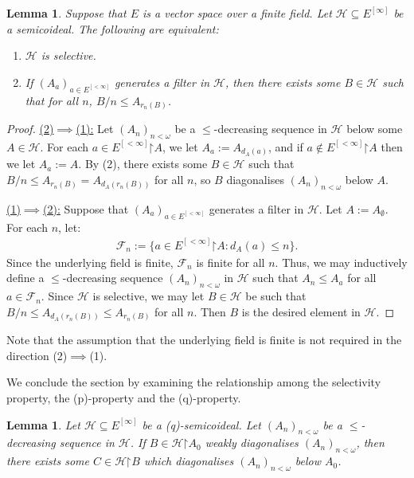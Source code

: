\documentclass[10pt,a4paper]{amsart}
\theoremstyle{plain}
\numberwithin{equation}{section}
\newtheorem{lemma}[theorem]{Lemma}
\theoremstyle{definition}
\newcommand{\F}{\cal{F}}
\newcommand{\cal}{\mathcal}
\newcommand{\restrictedto}{\mathord{\upharpoonright}}
\renewcommand{\H}{\cal{H}}
\begin{document}
\begin{lemma}
    Suppose that $E$ is a vector space over a finite field. Let $\H \subseteq E^{[\infty]}$ be a semicoideal. The following are equivalent:
    \begin{enumerate}
        \item $\H$ is selective.
        
        \item If $(A_a)_{a \in E^{[<\infty]}}$ generates a filter in $\H$, then there exists some $B \in \H$ such that for all $n$, $B/n \leq A_{r_n(B)}$. 
    \end{enumerate}
\end{lemma}

\begin{proof}
    \underline{(2)$\implies$(1):} Let $(A_n)_{n<\omega}$ be a $\leq$-decreasing sequence in $\H$ below some $A \in \H$. For each $a \in E^{[<\infty]}\restrictedto A$, we let $A_a := A_{d_A(a)}$, and if $a \notin E^{[<\infty]}\restrictedto A$ then we let $A_a := A$. By (2), there exists some $B \in \H$ such that $B/n \leq A_{r_n(B)} = A_{d_A(r_n(B))}$ for all $n$, so $B$ diagonalises $(A_n)_{n<\omega}$ below $A$. 

    \underline{(1)$\implies$(2):} Suppose that $(A_a)_{a \in E^{[<\infty]}}$ generates a filter in $\H$. Let $A := A_\emptyset$. For each $n$, let:
    \begin{align*}
        \F_n := \{a \in E^{[<\infty]}\restrictedto A : d_A(a) \leq n\}.
    \end{align*}
    Since the underlying field is finite, $\F_n$ is finite for all $n$. Thus, we may inductively define a $\leq$-decreasing sequence $(A_n)_{n<\omega}$ in $\H$ such that $A_n \leq A_a$ for all $a \in \F_n$. Since $\H$ is selective, we may let $B \in \H$ be such that $B/n \leq A_{d_A(r_n(B))} \leq A_{r_n(B)}$ for all $n$. Then $B$ is the desired element in $\H$.
\end{proof}

Note that the assumption that the underlying field is finite is not required in the direction (2)$\implies$(1).

We conclude the section by examining the relationship among the selectivity property, the (p)-property and the (q)-property.

\begin{lemma}
\label{lem:(q)-property.refines.diagonalisation}
    Let $\H \subseteq E^{[\infty]}$ be a (q)-semicoideal. Let $(A_n)_{n<\omega}$ be a $\leq$-decreasing sequence in $\H$. If $B \in \H\restrictedto A_0$ weakly diagonalises $(A_n)_{n<\omega}$, then there exists some $C \in \H\restrictedto B$ which diagonalises $(A_n)_{n<\omega}$ below $A_0$.
\end{lemma}
\end{document}
